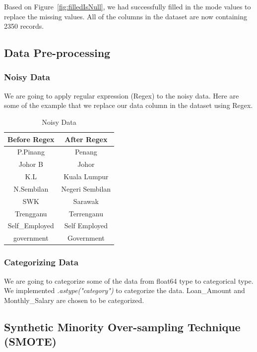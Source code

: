 \documentclass[11pt]{article}
\begin{document}
Based on Figure~\ref{fig:filledIsNull}, we had successfully filled in the mode values to replace the missing values. All of the columns in the dataset are now containing 2350 records. 

\clearpage
\subsection{Data Pre-processing}
\subsubsection{Noisy Data}
We are going to apply regular expression (Regex) to the noisy data. Here are some of the example that we replace our data column in the dataset using Regex.

\begin{table}[ht]
\centering
\caption{\label{tab:noisyData}Noisy Data}
\begin{adjustbox}{width=.5\textwidth}
\begin{tabular}{|c|c|}
\hline
\multicolumn{1}{|l|}{\textbf{Before Regex}} & \textbf{After Regex} \\ \hline
P.Pinang  & Penang \\ \hline
Johor B  & Johor \\ \hline
K.L & Kuala Lumpur \\ \hline
N.Sembilan & Negeri Sembilan \\ \hline
SWK & Sarawak \\ \hline
Trengganu & Terrenganu \\ \hline
Self\_Employed & Self Employed \\ \hline
government & Government \\ \hline
\end{tabular}
\end{adjustbox}
\end{table}

\subsubsection{Categorizing Data}
We are going to categorize some of the data from float64 type to categorical type. We implemented \textit{.astype("category")} to categorize the data. Loan\_Amount and Monthly\_Salary are chosen to be categorized.

\clearpage
\subsection{Synthetic Minority Over-sampling Technique (SMOTE)}
\end{document}
